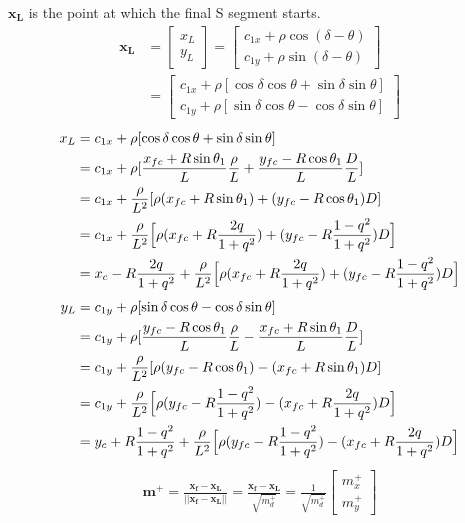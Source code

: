 \documentclass[12pt]{article}
\begin{document}
$\mathbf{x_L}$ is the point at which the final S segment starts.
\begin{align}
    \mathbf{x_L} &= \begin{bmatrix}x_L\\y_L\end{bmatrix}
    = \begin{bmatrix}
        c_{1x}+\rho\cos(\delta-\theta)\\
        c_{1y}+\rho\sin(\delta-\theta)
    \end{bmatrix}\\
    &= \begin{bmatrix}
        c_{1x}+\rho[\cos\delta\cos\theta + \sin\delta\sin\theta]\\
        c_{1y}+\rho[\sin\delta\cos\theta - \cos\delta\sin\theta]
    \end{bmatrix}
\end{align}
\begin{align}
    x_L &= c_{1x}+\rho[\cos\delta\cos\theta + \sin\delta\sin\theta]\\
    &= c_{1x}+\rho[\frac{x_{fc} + R\sin\theta_1}{L}\frac{\rho}{L} + \frac{y_{fc}-R\cos\theta_1}{L}\frac{D}{L}]\\
    &= c_{1x}+\frac{\rho}{L^2}[\rho(x_{fc} + R\sin\theta_1) + (y_{fc}-R\cos\theta_1)D]\\
    &= c_{1x}+\frac{\rho}{L^2}\Bigl[\rho(x_{fc} + R\frac{2q}{1+q^2}) + (y_{fc}-R\frac{1-q^2}{1+q^2})D\Bigr]\\
    &= x_c-R\frac{2q}{1+q^2}+\frac{\rho}{L^2}\Bigl[\rho(x_{fc} + R\frac{2q}{1+q^2}) + (y_{fc}-R\frac{1-q^2}{1+q^2})D\Bigr]
\end{align}
\begin{align}
    y_L &= c_{1y}+\rho[\sin\delta\cos\theta - \cos\delta\sin\theta]\\
    &= c_{1y}+\rho[\frac{y_{fc}-R\cos\theta_1}{L}\frac{\rho}{L} - \frac{x_{fc} + R\sin\theta_1}{L}\frac{D}{L}]\\
    &= c_{1y}+\frac{\rho}{L^2}[\rho(y_{fc}-R\cos\theta_1) - (x_{fc} + R\sin\theta_1)D]\\
    &= c_{1y}+\frac{\rho}{L^2}\Bigl[\rho(y_{fc}-R\frac{1-q^2}{1+q^2}) - (x_{fc} + R\frac{2q}{1+q^2})D\Bigr]\\
    &= y_c + R\frac{1-q^2}{1+q^2}+\frac{\rho}{L^2}\Bigl[\rho(y_{fc}-R\frac{1-q^2}{1+q^2}) - (x_{fc} + R\frac{2q}{1+q^2})D\Bigr]
\end{align}
\begin{align}
    \mathbf{m^+} = \frac{\mathbf{x_f} - \mathbf{x_L}}{||\mathbf{x_f} - \mathbf{x_L}||}
    = \frac{\mathbf{x_f} - \mathbf{x_L}}{\sqrt{m_d^+}}
    = \frac{1}{\sqrt{m_d^+}}\begin{bmatrix}
        m_x^+\\m_y^+
    \end{bmatrix}
\end{align}
\end{document}

